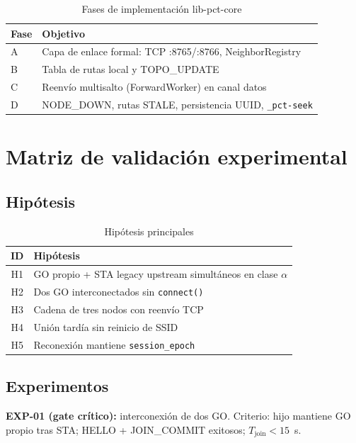 \begin{table}[htbp]
  \centering
  \caption{Fases de implementación lib-pct-core}
  \label{tab:fases}
  \begin{tabular}{@{}ll@{}}
    \toprule
    \textbf{Fase} & \textbf{Objetivo} \\
    \midrule
    A & Capa de enlace formal: TCP :8765/:8766, NeighborRegistry \\
    B & Tabla de rutas local y TOPO\_UPDATE \\
    C & Reenvío multisalto (ForwardWorker) en canal datos \\
    D & NODE\_DOWN, rutas STALE, persistencia UUID, \texttt{\_pct-seek} \\
    \bottomrule
  \end{tabular}
\end{table}

\section{Matriz de validación experimental}
\label{sec:matriz-validacion}

\subsection{Hipótesis}

\begin{table}[htbp]
  \centering
  \caption{Hipótesis principales}
  \label{tab:hipotesis}
  \begin{tabular}{@{}cl@{}}
    \toprule
    \textbf{ID} & \textbf{Hipótesis} \\
    \midrule
    H1 & GO propio + STA legacy upstream simultáneos en clase $\alpha$ \\
    H2 & Dos GO interconectados sin \texttt{connect()} \\
    H3 & Cadena de tres nodos con reenvío TCP \\
    H4 & Unión tardía sin reinicio de SSID \\
    H5 & Reconexión mantiene \texttt{session\_epoch} \\
    \bottomrule
  \end{tabular}
\end{table}

\subsection{Experimentos}

\textbf{EXP-01 (gate crítico):} interconexión de dos GO. Criterio: hijo mantiene GO propio tras STA; HELLO + JOIN\_COMMIT exitosos; $T_{\mathrm{join}} < 15$~s.

